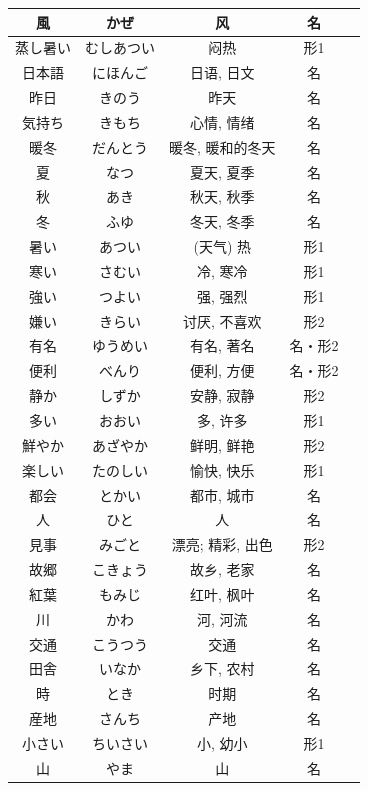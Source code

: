 \begin{longtable}{|c|c|c|c|c|}
風 & かぜ & 风 & 名 &  \\ \hline
蒸し暑い & むしあつい & 闷热 & 形1 &  \\ \hline
日本語 & にほんご & 日语, 日文 & 名 &  \\ \hline
昨日 & きのう & 昨天 & 名 &  \\ \hline
気持ち & きもち & 心情, 情绪 & 名 &  \\ \hline
暖冬 & だんとう & 暖冬, 暖和的冬天 & 名 &  \\ \hline
夏 & なつ & 夏天, 夏季 & 名 &  \\ \hline
秋 & あき & 秋天, 秋季 & 名 &  \\ \hline
冬 & ふゆ & 冬天, 冬季 & 名 &  \\ \hline
暑い & あつい & (天气) 热 & 形1 &  \\ \hline
寒い & さむい & 冷, 寒冷 & 形1 &  \\ \hline
強い & つよい & 强, 强烈 & 形1 &  \\ \hline
嫌い & きらい & 讨厌, 不喜欢 & 形2 &  \\ \hline
有名 & ゆうめい & 有名, 著名 & 名・形2 &  \\ \hline
便利 & べんり & 便利, 方便 & 名・形2 &  \\ \hline
静か & しずか & 安静, 寂静 & 形2 &  \\ \hline
多い & おおい & 多, 许多 & 形1 &  \\ \hline
鮮やか & あざやか & 鲜明, 鲜艳 & 形2 &  \\ \hline
楽しい & たのしい & 愉快, 快乐 & 形1 &  \\ \hline
都会 & とかい & 都市, 城市 & 名 &  \\ \hline
人 & ひと & 人 & 名 &  \\ \hline
見事 & みごと & 漂亮; 精彩, 出色 & 形2 &  \\ \hline
故郷 & こきょう & 故乡, 老家 & 名 &  \\ \hline
紅葉 & もみじ & 红叶, 枫叶 & 名 &  \\ \hline
川 & かわ & 河, 河流 & 名 &  \\ \hline
交通 & こうつう & 交通 & 名 &  \\ \hline
田舎 & いなか & 乡下, 农村 & 名 &  \\ \hline
時 & とき & 时期 & 名 &  \\ \hline
産地 & さんち & 产地 & 名 &  \\ \hline
小さい & ちいさい & 小, 幼小 & 形1 &  \\ \hline
山 & やま & 山 & 名 &  \\ \hline

\end{longtable}
